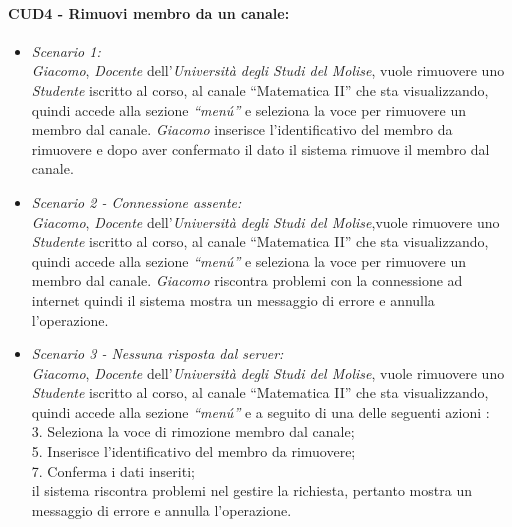 \paragraph{CUD4 - Rimuovi membro da un canale:\\}
\begin{itemize}
	\item \textit{Scenario 1:\\}
	\textit{Giacomo}, \textit{Docente} dell’\textit{Università degli Studi del Molise}, vuole rimuovere uno \textit{Studente} iscritto al corso, al canale “Matematica II” che sta visualizzando, quindi accede alla sezione \textit{“menú”} e seleziona la voce per rimuovere un membro dal canale. \textit{Giacomo} inserisce l’identificativo del membro da rimuovere e dopo aver confermato il dato il sistema rimuove il membro dal canale.\\
	
	\item \textit{Scenario 2 - Connessione assente:\\}
	\textit{Giacomo}, \textit{Docente} dell’\textit{Università degli Studi del Molise},vuole rimuovere uno \textit{Studente} iscritto al corso, al canale “Matematica II” che sta visualizzando, quindi accede alla sezione \textit{“menú”} e seleziona la voce per rimuovere un membro dal canale.
	\textit{Giacomo} riscontra problemi con la connessione ad internet quindi il sistema mostra un messaggio di errore e annulla l’operazione.\\
	
	\item \textit{Scenario 3 - Nessuna risposta dal server:\\}
	\textit{Giacomo}, \textit{Docente} dell’\textit{Università degli Studi del Molise}, vuole rimuovere uno \textit{Studente} iscritto al corso, al canale “Matematica II” che sta visualizzando, quindi accede alla sezione \textit{“menú”} e a seguito di una delle seguenti azioni :\\
	3. Seleziona la voce di rimozione membro dal canale;\\
	5. Inserisce l’identificativo del membro da rimuovere;\\
	7. Conferma i dati inseriti;\\
	il sistema riscontra problemi nel gestire la richiesta, pertanto mostra un messaggio di errore e annulla l’operazione.\\
\end{itemize}

